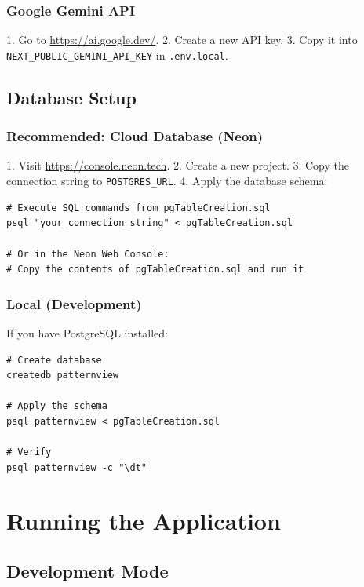 \subsubsection{Google Gemini API}

1. Go to \url{https://ai.google.dev/}.
2. Create a new API key.
3. Copy it into \texttt{NEXT\_PUBLIC\_GEMINI\_API\_KEY} in \texttt{.env.local}.

\subsection{Database Setup}

\subsubsection{Recommended: Cloud Database (Neon)}

1. Visit \url{https://console.neon.tech}.
2. Create a new project.
3. Copy the connection string to \texttt{POSTGRES\_URL}.
4. Apply the database schema:

\begin{verbatim}
# Execute SQL commands from pgTableCreation.sql
psql "your_connection_string" < pgTableCreation.sql

# Or in the Neon Web Console:
# Copy the contents of pgTableCreation.sql and run it
\end{verbatim}

\subsubsection{Local (Development)}

If you have PostgreSQL installed:

\begin{verbatim}
# Create database
createdb patternview

# Apply the schema
psql patternview < pgTableCreation.sql

# Verify
psql patternview -c "\dt"
\end{verbatim}

\section{Running the Application}

\subsection{Development Mode}


